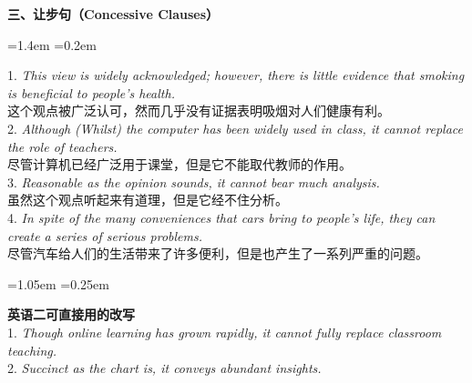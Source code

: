 \documentclass[11pt,a4paper]{ctexart}
\newcommand{\en}[1]{\textit{#1}}
\newenvironment{note}{%
  \par\addvspace{5pt}%
  \begin{list}{}{\leftmargin=1.05em \rightmargin=0.25em \listparindent=0pt
    \itemindent=0pt \topsep=0pt \parsep=2pt \itemsep=2pt \partopsep=0pt}%
  \item\relax\small\color{ink}%
}{%
  \end{list}\addvspace{5pt}%
}
\newenvironment{eg}{%
  \par\addvspace{4pt}%
  \begin{list}{}{\leftmargin=1.4em \rightmargin=0.2em \listparindent=0pt
    \itemindent=0pt \topsep=0pt \parsep=2pt \itemsep=2pt \partopsep=0pt}%
  \item\relax
}{%
  \end{list}\addvspace{5pt}%
}
\begin{document}
\par\addvspace{6pt}\noindent\textbf{三、让步句（Concessive Clauses）}\par\addvspace{2pt}
\begin{eg}
1. \en{This view is widely acknowledged; however, there is little evidence that smoking is beneficial to people's health.}\\
这个观点被广泛认可，然而几乎没有证据表明吸烟对人们健康有利。\\
2. \en{Although (Whilst) the computer has been widely used in class, it cannot replace the role of teachers.}\\
尽管计算机已经广泛用于课堂，但是它不能取代教师的作用。\\
3. \en{Reasonable as the opinion sounds, it cannot bear much analysis.}\\
虽然这个观点听起来有道理，但是它经不住分析。\\
4. \en{In spite of the many conveniences that cars bring to people's life, they can create a series of serious problems.}\\
尽管汽车给人们的生活带来了许多便利，但是也产生了一系列严重的问题。\\
\end{eg}
\begin{note}
\textbf{英语二可直接用的改写}\\
1. \en{Though online learning has grown rapidly, it cannot fully replace classroom teaching.}\\
2. \en{Succinct as the chart is, it conveys abundant insights.}
\end{note}
\end{document}
